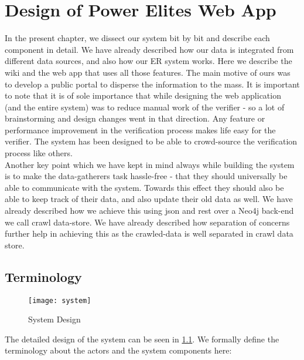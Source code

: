 \chapter{Design of Power Elites Web App}
\label{chapwebapp}

In the present chapter, we dissect our system bit by bit and describe each component in detail. We have already described how our data is integrated from different data sources, and also how our ER system works. Here we describe the wiki and the web app that uses all those features. The main motive of ours was to develop a public portal to disperse the information to the mass. It is important to note that it is of sole importance that while designing the web application (and the entire system) was to reduce manual work of the verifier - so a lot of brainstorming and design changes went in that direction. Any feature or performance improvement in the verification process makes life easy for the verifier. The system has been designed to be able to crowd-source the verification process like others. \\

Another key point which we have kept in mind always while building the system is to make the 
data-gatherers task hassle-free  - that they should universally be able to communicate with the system. Towards this effect they should also be able to keep track of their data, and also update their old data as well. We have already described how we achieve this using json and rest over a Neo4j back-end we call crawl data-store. We have already described how separation of concerns  further help in achieving this as the crawled-data is well separated in crawl data store. \\

\section{Terminology}

\begin{figure}[H]
\begin{center}  
\texttt{[image: system]} 
\caption{System Design}
\label{fig:system}
\end{center}
\end{figure}

The detailed design of the system can be seen in \ref{fig:system}. We formally define the terminology about the actors and the system components here:


